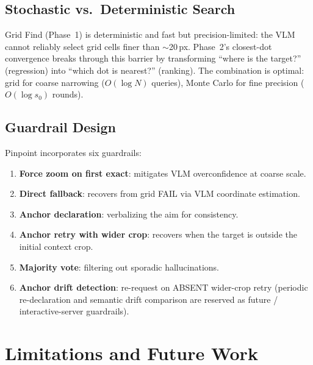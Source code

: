 \documentclass[sigconf,nonacm]{acmart}
\begin{document}
\subsection{Stochastic vs.\ Deterministic Search}

Grid Find (Phase~1) is deterministic and fast but precision-limited:
the VLM cannot reliably select grid cells finer than $\sim$20\,px.
Phase~2's closest-dot convergence breaks through this barrier by
transforming ``where is the target?'' (regression) into ``which dot is
nearest?'' (ranking).  The combination is optimal: grid for coarse
narrowing ($O(\log N)$ queries), Monte Carlo for fine precision
($O(\log s_0)$ rounds).

\subsection{Guardrail Design}

Pinpoint incorporates six guardrails:

\begin{enumerate}
  \item \textbf{Force zoom on first exact}: mitigates VLM
    overconfidence at coarse scale.
  \item \textbf{Direct fallback}: recovers from grid FAIL via VLM
    coordinate estimation.
  \item \textbf{Anchor declaration}: verbalizing the aim for
    consistency.
  \item \textbf{Anchor retry with wider crop}: recovers when the
    target is outside the initial context crop.
  \item \textbf{Majority vote}: filtering out sporadic hallucinations.
  \item \textbf{Anchor drift detection}: re-request on ABSENT
    wider-crop retry (periodic re-declaration and semantic drift
    comparison are reserved as future / interactive-server
    guardrails).
\end{enumerate}





\section{Limitations and Future Work}
\label{sec:limitations}
\end{document}
